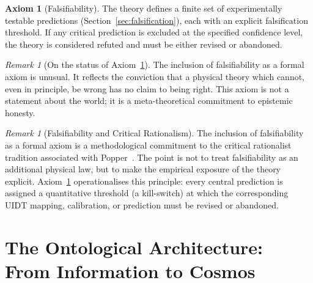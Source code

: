 \documentclass[12pt,a4paper,twoside]{article}
\theoremstyle{plain}
\theoremstyle{definition}
\newtheorem{axiom}{Axiom}
\theoremstyle{remark}
\newtheorem{remark}[theorem]{Remark}
\begin{document}
\begin{axiom}[Falsifiability]
\label{ax:falsifiability}
The theory defines a finite set of experimentally testable predictions
(Section~\ref{sec:falsification}), each with an explicit falsification
threshold. If any critical prediction is excluded at the specified confidence
level, the theory is considered refuted and must be either revised or abandoned.
\end{axiom}

\begin{remark}[On the status of Axiom~\ref{ax:falsifiability}]
The inclusion of falsifiability as a formal axiom is unusual. It reflects the
conviction that a physical theory which cannot, even in principle, be wrong has
no claim to being right. This axiom is not a statement about the world; it is a
meta-theoretical commitment to epistemic honesty.
\end{remark}

\begin{remark}[Falsifiability and Critical Rationalism]
\label{rem:popper}
The inclusion of falsifiability as a formal axiom is a methodological
commitment to the critical rationalist tradition associated with
Popper~\cite{Popper1934,Popper1963}. The point is not to treat falsifiability
as an additional physical law, but to make the empirical exposure of the theory
explicit. Axiom~\ref{ax:falsifiability} operationalises this principle: every
central prediction is assigned a quantitative threshold (a kill-switch) at
which the corresponding UIDT mapping, calibration, or prediction must be
revised or abandoned.
\end{remark}


\newpage
\section{The Ontological Architecture: From Information to Cosmos}
\label{sec:architecture}
\end{document}
